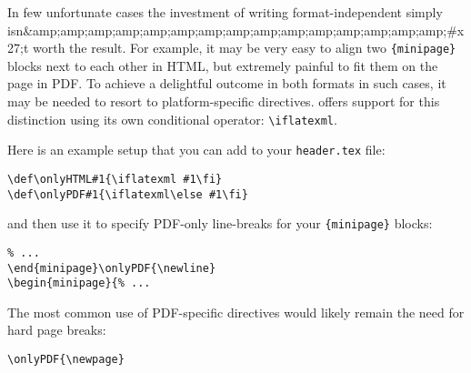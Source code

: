 
In few unfortunate cases the investment of writing format-independent \latex simply isn&amp;amp;amp;amp;amp;amp;amp;amp;amp;amp;amp;amp;amp;amp;amp;#x27;t worth the result. For example, it may be very easy to align two \verb|{minipage}| blocks next to each other in HTML, but extremely painful to fit them on the page in PDF. To achieve a delightful outcome in both formats in such cases, it may be needed to resort to platform-specific directives. \latexml offers support for this distinction using its own conditional operator: \verb|\iflatexml|.

Here is an example setup that you can add to your \verb|header.tex| file:
\begin{lstlisting}
\def\onlyHTML#1{\iflatexml #1\fi}
\def\onlyPDF#1{\iflatexml\else #1\fi}
\end{lstlisting}

and then use it to specify PDF-only line-breaks for your \verb|{minipage}| blocks:
\begin{lstlisting}
% ...
\end{minipage}\onlyPDF{\newline}
\begin{minipage}{% ...
\end{lstlisting}

The most common use of PDF-specific directives would likely remain the need for hard page breaks:
\begin{lstlisting}
\onlyPDF{\newpage}
\end{lstlisting}